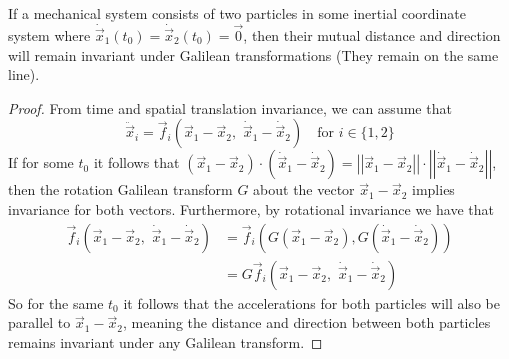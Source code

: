 \documentclass{article}
\begin{document}
		\begin{thm}
			If a mechanical system consists of two particles in some inertial coordinate system where $\dot{\vec{x}}_1 \left(t_0\right) = \dot{\vec{x}}_2 \left(t_0\right) = \vec{0}$, then their mutual distance and direction will remain invariant under Galilean transformations (They remain on the same line).
		\end{thm}
		\begin{proof}
			From time and spatial translation invariance, we can assume that
			$$ \ddot{\vec{x}}_i = \vec{f}_i \left(  \vec{x}_1 - \vec{x}_2, \,\,\dot{\vec{x}}_1 - \dot{\vec{x}}_2\right) \quad \text{for } i \in \{1,2\} $$ 
			If for some $t_0$ it follows that $\left(\vec{x}_1 - \vec{x}_2\right) \cdot \left(\dot{\vec{x}}_1 - \dot{\vec{x}}_2\right) = \left|\left| \vec{x}_1 - \vec{x}_2\right|\right| \cdot \left|\left| \dot{\vec{x}}_1 - \dot{\vec{x}}_2 \right|\right|$, then the rotation Galilean transform $G$ about the vector $\vec{x}_1 - \vec{x}_2$ implies invariance for both vectors. Furthermore, by rotational invariance we have that
			\begin{align*}
				\vec{f}_i \left(\vec{x}_1 - \vec{x}_2, \,\, \dot{\vec{x}}_1 -  \dot{\vec{x}}_2 \right) &= \vec{f}_i \left( G \left(\vec{x}_1 - \vec{x}_2\right), G \left(\dot{\vec{x}}_1 - \dot{\vec{x}}_2 \right)\right) \\
				&= G \vec{f}_i  \left(\vec{x}_1 - \vec{x}_2, \,\, \dot{\vec{x}}_1 -  \dot{\vec{x}}_2  \right) 
			\end{align*}
			So for the same $t_0$ it follows that the accelerations for both particles will also be parallel to $\vec{x}_1 - \vec{x}_2$, meaning the distance and direction between both particles remains invariant under any Galilean transform.
		\end{proof}
	
		\newpage
		
\end{document}
